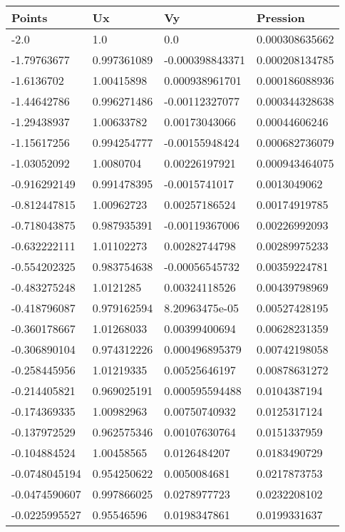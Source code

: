 \begin{longtable}{llll}
	Points & Ux & Vy & Pression \\ 
\midrule 
	-2.0 & 1.0 & 0.0 & 0.000308635662 \\ 
	-1.79763677 & 0.997361089 & -0.000398843371 & 0.000208134785 \\ 
	-1.6136702 & 1.00415898 & 0.000938961701 & 0.000186088936 \\ 
	-1.44642786 & 0.996271486 & -0.00112327077 & 0.000344328638 \\ 
	-1.29438937 & 1.00633782 & 0.00173043066 & 0.00044606246 \\ 
	-1.15617256 & 0.994254777 & -0.00155948424 & 0.000682736079 \\ 
	-1.03052092 & 1.0080704 & 0.00226197921 & 0.000943464075 \\ 
	-0.916292149 & 0.991478395 & -0.0015741017 & 0.0013049062 \\ 
	-0.812447815 & 1.00962723 & 0.00257186524 & 0.00174919785 \\ 
	-0.718043875 & 0.987935391 & -0.00119367006 & 0.00226992093 \\ 
	-0.632222111 & 1.01102273 & 0.00282744798 & 0.00289975233 \\ 
	-0.554202325 & 0.983754638 & -0.00056545732 & 0.00359224781 \\ 
	-0.483275248 & 1.0121285 & 0.00324118526 & 0.00439798969 \\ 
	-0.418796087 & 0.979162594 & 8.20963475e-05 & 0.00527428195 \\ 
	-0.360178667 & 1.01268033 & 0.00399400694 & 0.00628231359 \\ 
	-0.306890104 & 0.974312226 & 0.000496895379 & 0.00742198058 \\ 
	-0.258445956 & 1.01219335 & 0.00525646197 & 0.00878631272 \\ 
	-0.214405821 & 0.969025191 & 0.000595594488 & 0.0104387194 \\ 
	-0.174369335 & 1.00982963 & 0.00750740932 & 0.0125317124 \\ 
	-0.137972529 & 0.962575346 & 0.00107630764 & 0.0151337959 \\ 
	-0.104884524 & 1.00458565 & 0.0126484207 & 0.0183490729 \\ 
	-0.0748045194 & 0.954250622 & 0.0050084681 & 0.0217873753 \\ 
	-0.0474590607 & 0.997866025 & 0.0278977723 & 0.0232208102 \\ 
	-0.0225995527 & 0.95546596 & 0.0198347861 & 0.0199331637 \\ 

\end{longtable}
